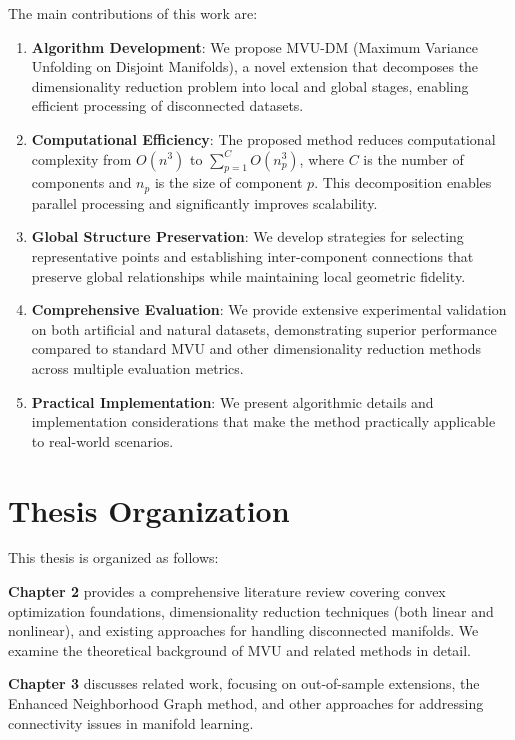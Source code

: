 The main contributions of this work are:

\begin{enumerate}
    \item \textbf{Algorithm Development}: We propose \ac{MVU-DM} (Maximum Variance Unfolding on Disjoint Manifolds), a novel extension that decomposes the dimensionality reduction problem into local and global stages, enabling efficient processing of disconnected datasets.

    \item \textbf{Computational Efficiency}: The proposed method reduces computational complexity from $O(n^3)$ to $\sum_{p=1}^{C} O(n_p^3)$, where $C$ is the number of components and $n_p$ is the size of component $p$. This decomposition enables parallel processing and significantly improves scalability.

    \item \textbf{Global Structure Preservation}: We develop strategies for selecting representative points and establishing inter-component connections that preserve global relationships while maintaining local geometric fidelity.

    \item \textbf{Comprehensive Evaluation}: We provide extensive experimental validation on both artificial and natural datasets, demonstrating superior performance compared to standard \ac{MVU} and other dimensionality reduction methods across multiple evaluation metrics.

    \item \textbf{Practical Implementation}: We present algorithmic details and implementation considerations that make the method practically applicable to real-world scenarios.
\end{enumerate}

\section{Thesis Organization}

This thesis is organized as follows:

\textbf{Chapter 2} provides a comprehensive literature review covering convex optimization foundations, dimensionality reduction techniques (both linear and nonlinear), and existing approaches for handling disconnected manifolds. We examine the theoretical background of \ac{MVU} and related methods in detail.

\textbf{Chapter 3} discusses related work, focusing on out-of-sample extensions, the Enhanced Neighborhood Graph method, and other approaches for addressing connectivity issues in manifold learning.

